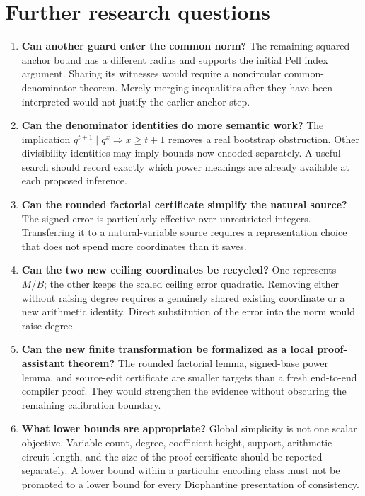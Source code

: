 \documentclass[11pt,letterpaper]{article}
\theoremstyle{remark}\newtheorem{remark}[theorem]{Remark}
\begin{document}


\section{Further research questions}

\begin{enumerate}
\item \textbf{Can another guard enter the common norm?}
The remaining squared-anchor bound has a different radius and supports the
initial Pell index argument. Sharing its witnesses would require a
noncircular common-denominator theorem. Merely merging inequalities after
they have been interpreted would not justify the earlier anchor step.
\item \textbf{Can the denominator identities do more semantic work?}
The implication \(q^{t+1}\mid q^x\Rightarrow x\ge t+1\) removes a real
bootstrap obstruction. Other divisibility identities may imply bounds now
encoded separately. A useful search should record exactly which power
meanings are already available at each proposed inference.
\item \textbf{Can the rounded factorial certificate simplify the natural
source?}
The signed error is particularly effective over unrestricted integers.
Transferring it to a natural-variable source requires a representation
choice that does not spend more coordinates than it saves.
\item \textbf{Can the two new ceiling coordinates be recycled?}
One represents \(M/B\); the other keeps the scaled ceiling error quadratic.
Removing either without raising degree requires a genuinely shared existing
coordinate or a new arithmetic identity. Direct substitution of the error
into the norm would raise degree.
\item \textbf{Can the new finite transformation be formalized as a local
proof-assistant theorem?}
The rounded factorial lemma, signed-base power lemma, and source-edit
certificate are smaller targets than a fresh end-to-end compiler proof.
They would strengthen the evidence without obscuring the remaining
calibration boundary.
\item \textbf{What lower bounds are appropriate?}
Global simplicity is not one scalar objective. Variable count, degree,
coefficient height, support, arithmetic-circuit length, and the size of the
proof certificate should be reported separately. A lower bound within a
particular encoding class must not be promoted to a lower bound for every
Diophantine presentation of consistency.
\end{enumerate}
\end{document}
